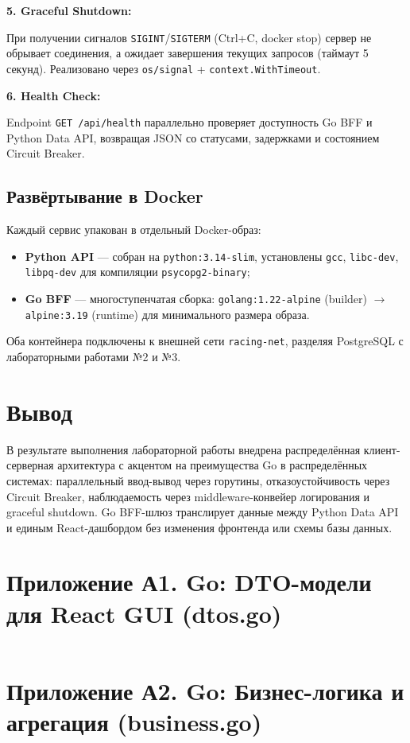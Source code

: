 \documentclass[oneside,a4paper,14pt]{extarticle}
\begin{document}
\textbf{5. Graceful Shutdown:}

При получении сигналов \texttt{SIGINT}/\texttt{SIGTERM} (Ctrl+C, docker stop) сервер не обрывает соединения, а ожидает завершения текущих запросов (таймаут 5 секунд). Реализовано через \texttt{os/signal} + \texttt{context.WithTimeout}.

\textbf{6. Health Check:}

Endpoint \texttt{GET /api/health} параллельно проверяет доступность Go BFF и Python Data API, возвращая JSON со статусами, задержками и состоянием Circuit Breaker.

\subsection*{Развёртывание в Docker}
Каждый сервис упакован в отдельный Docker-образ:
\begin{itemize}
    \item[$-$] \textbf{Python API} — собран на \texttt{python:3.14-slim}, установлены \texttt{gcc}, \texttt{libc-dev}, \texttt{libpq-dev} для компиляции \texttt{psycopg2-binary};
    \item[$-$] \textbf{Go BFF} — многоступенчатая сборка: \texttt{golang:1.22-alpine} (builder) $\to$ \texttt{alpine:3.19} (runtime) для минимального размера образа.
\end{itemize}
Оба контейнера подключены к внешней сети \texttt{racing-net}, разделяя PostgreSQL с лабораторными работами №2 и №3.

\section*{Вывод}
В результате выполнения лабораторной работы внедрена распределённая клиент-серверная архитектура с акцентом на преимущества Go в распределённых системах: параллельный ввод-вывод через горутины, отказоустойчивость через Circuit Breaker, наблюдаемость через middleware-конвейер логирования и graceful shutdown. Go BFF-шлюз транслирует данные между Python Data API и единым React-дашбордом без изменения фронтенда или схемы базы данных.

\newpage

\section*{Приложение А1. Go: DTO-модели для React GUI (dtos.go)}
\inputminted{go}{code/go/dtos.go}

\section*{Приложение А2. Go: Бизнес-логика и агрегация (business.go)}
\inputminted{go}{code/go/business.go}
\end{document}
